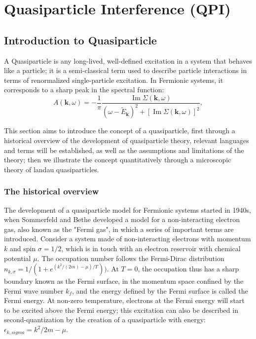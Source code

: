 \chapter{Quasiparticle Interference (QPI)}
\section{Introduction to Quasiparticle}
A Quasiparticle is any long-lived, well-defined excitation in a system that behaves like a particle; it is a semi-classical term used to describe particle interactions in terms of renormalized single-particle excitation. In Fermionic systems, it corresponds to a sharp peak in the spectral function: 
	\[
	A(\mathbf{k}, \omega) = -\frac{1}{\pi} \frac{\operatorname{Im} \Sigma(\mathbf{k}, \omega)}{(\omega - \tilde{E}_{\mathbf{k}})^2 + [\operatorname{Im} \Sigma(\mathbf{k}, \omega)]^2},
	\]

This section aims to introduce the concept of a quasiparticle, first through a historical overview of the development of quasiparticle theory, relevant languages and terms will be established, as well as the assumptions and limitations of the theory; then we illustrate the concept quantitatively through a microscopic theory of landau quasiparticles. 

\subsection{The historical overview}
The development of a quasiparticle model for Fermionic systems started in 1940s, when Sommerfeld and Bethe\cite{SommerfeldBethe1933} developed a model for a non-interacting electron gas, also known as the "Fermi gas", in which a series of important terms are introduced. Consider a system made of non-interacting electrons with momentum $k$ and spin $\sigma = 1/2$, which is in touch with an electron reservoir with chemical potential $\mu$. The occupation number follows the Fermi-Dirac distribution $n_{k,\sigma}=1/(1+e^{(k^2/(2m)-\mu)/T}))$. At $T=0$, the occupation thus has a sharp boundary known as the Fermi surface, in the momentum space confined by the Fermi wave number $k_f$, and the energy defined by the Fermi surface is called the Fermi energy. At non-zero temperature, electrons at the Fermi energy will start to be excited above the Fermi energy; this excitation can also be described in second-quantization by the creation of a quasiparticle with energy: $\epsilon_{k,sigma} = k^2/2m - \mu$. 

